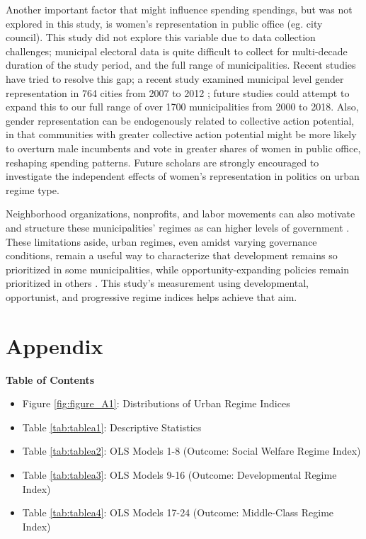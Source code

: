 \documentclass[preprint, 3p,
authoryear]{elsarticle} %
\begin{document}
Another important factor that might influence spending spendings, but
was not explored in this study, is women's representation in public
office (eg. city council). This study did not explore this variable due
to data collection challenges; municipal electoral data is quite
difficult to collect for multi-decade duration of the study period, and
the full range of municipalities. Recent studies have tried to resolve
this gap; a recent study examined municipal level gender representation
in 764 cities from 2007 to 2012 \citep{suzuki_and_avellaneda_2018};
future studies could attempt to expand this to our full range of over
1700 municipalities from 2000 to 2018. Also, gender representation can
be endogenously related to collective action potential, in that
communities with greater collective action potential might be more
likely to overturn male incumbents and vote in greater shares of women
in public office, reshaping spending patterns. Future scholars are
strongly encouraged to investigate the independent effects of women's
representation in politics on urban regime type.

Neighborhood organizations, nonprofits, and labor movements can also
motivate and structure these municipalities' regimes
\citep{logan_and_rabrenovic_1990, nissen_1995, takao_2006, camou_2014, stone_et_al_2015}
as can higher levels of government
\citep{sellers_2002, tsukamoto_2012, shin_et_al_2015}. These limitations
aside, urban regimes, even amidst varying governance conditions, remain
a useful way to characterize that development remains so prioritized in
some municipalities, while opportunity-expanding policies remain
prioritized in others \citep{funck_2007, ji_and_imai_2022}. This study's
measurement using developmental, opportunist, and progressive regime
indices helps achieve that aim.

\singlespacing

\newpage

\hypertarget{appendix}{%
\section*{Appendix}\label{appendix}}

\large
\doublespacing

\textbf{Table of Contents}

\large

\begin{itemize}
\item
  Figure \ref{fig:figure_A1}: Distributions of Urban Regime Indices
\item
  Table \ref{tab:tablea1}: Descriptive Statistics
\item
  Table \ref{tab:tablea2}: OLS Models 1-8 (Outcome: Social Welfare
  Regime Index)
\item
  Table \ref{tab:tablea3}: OLS Models 9-16 (Outcome: Developmental
  Regime Index)
\item
  Table \ref{tab:tablea4}: OLS Models 17-24 (Outcome: Middle-Class
  Regime Index)
\end{itemize}
\end{document}
